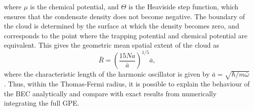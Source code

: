 where $\mu$ is the chemical potential, and $\Theta$ is the Heaviside step function, which ensures that the condensate density does not become negative. The boundary of the cloud is determined by the surface at which the density becomes zero, and corresponds to the point where the trapping potential and chemical potential are equivalent. This gives the geometric mean spatial extent of the cloud \cite[~p. 169]{BK:Pethick_Smith_2008} as
\begin{equation}
\bar{R} = \left(\frac{15Na}{\bar{a}}\right)^{1/5}\bar{a},
\end{equation}
where the characteristic length of the harmonic oscillator is given by
$\bar{a} = \sqrt{{\hbar}/{m\bar{\omega}}}$. Thus, within the Thomas-Fermi radius, it is possible to explain the behaviour of the BEC analytically and compare with exact results from numerically integrating the full GPE.

